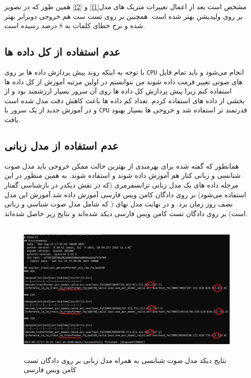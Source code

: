 همین طور که در تصویر \ref{f2} و \ref{f1}مشخص است بعد از اعمال تغییرات متریک های مدل بر روی ولیدیشن بهتر شده است. همچنین بر روی تست ست هم خروجی دوبرابر بهتر شده و نرخ خطای کلمات به 8 درصد رسیده است.

\subsection{عدم استفاده از کل داده ها}
با توجه به اینکه روند پیش پردازش داده ها بر روی 
\verb|CPU|
انجام می‌شود و باید تمام فایل های صوتی تغییر فرمت داده شوند من نتوانستم در اولین مرتبه آموزش از کل داده ها استفاده کنم زیرا پیش پردازش کل داده ها روی آن سرور بسیار ارزشمند بود و از بخشی از داده های استفاده کردم. تعداد کم داده ها باعث کاهش دقت مدل شده است و در آموزش جدید از یک سرور با 
\verb|CPU|
قدرتمند تر استفاده شد و خروجی ها بسیار بهبود یافت.

\subsection{عدم استفاده از مدل زبانی}
همانطور که گفته شده برای بهرمندی از بهترین حالت ممکن خروجی باید مدل صوت شنانسی و زبانی کنار هم آموزش داده شوند و استفاده شوند. به همین منظور در این مرحله داده های یک مدل زبانی ترانسفرمری (که در نقش دیکدر در بازشناسی گفتار استفاده می‌شود) بر روی دادگان کامن ویس فارسی آموزش داده شد.آموزش این مدل نصف روز زمان برد. و در نهایت مدل نهای ( که شامل مدل صوت شناسی و زبانی است) بر روی دادگان تست کامن ویس فارسی دیکد شده‌اند و نتایج زیر حاصل شده‌اند.

\begin{figure}[H]
  \centering
  \includegraphics[width=1\textwidth,height=7cm]{Images/Chapter3/decode_best.jpeg}
  \caption{
  نتایج دیکد مدل صوت شنانسی به همراه مدل زبانی بر روی دادگان تست کامن ویس فارسی
  }
  \label{fig:decode_best}
\end{figure}

